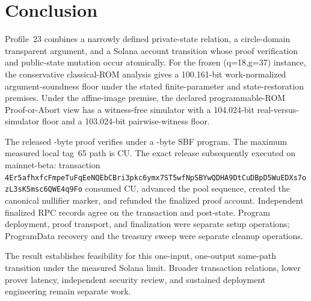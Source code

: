 \section{Conclusion}
\label{sec:conclusion}

Profile~23 combines a narrowly defined private-state relation, a
circle-domain transparent argument, and a Solana account transition whose
proof verification and public-state mutation occur atomically.  For the
frozen (q=18,g=37) instance, the conservative classical-ROM analysis gives
a 100.161-bit work-normalized argument-soundness floor under the stated
finite-parameter and state-restoration premises.  Under the affine-image
premise, the declared programmable-ROM Proof-or-Abort view has a witness-free
simulator with a 104.024-bit real-versus-simulator floor and a 103.024-bit
pairwise-witness floor.

The released \ProfileProofBytes-byte proof verifies under a
\ProfileSbfBytes-byte SBF program.  The maximum measured local tag~65 path is
\ProfileComputeUnits{} CU.  The exact release subsequently executed on
mainnet-beta: transaction
\nolinkurl{4Er5afhxfcFmpeTuFqEeNQEbCBri3pkc6ymx7ST5wfNpSBYwQDHA9DtCuDBpD5WuEDXs7ozL3sK5msc6QWE4q9Fo}
consumed \ProfileMainnetComputeUnits{} CU, advanced the pool sequence,
created the canonical nullifier marker, and refunded the finalized proof
account.  Independent finalized RPC records agree on the transaction and
post-state.  Program deployment, proof transport, and finalization were
separate setup operations; ProgramData recovery and the treasury sweep were
separate cleanup operations.

The result establishes feasibility for this one-input, one-output same-path
transition under the measured Solana limit.  Broader transaction relations,
lower prover latency, independent security review, and sustained deployment
engineering remain separate work.
